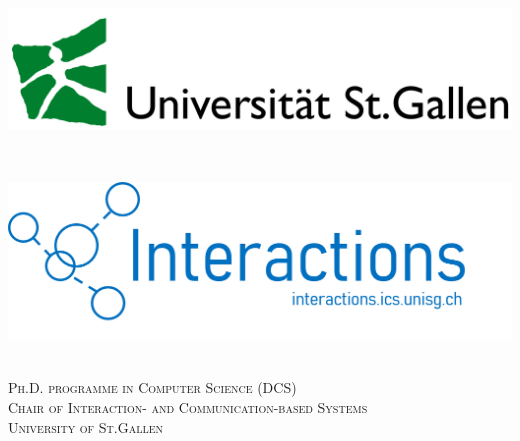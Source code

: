 \documentclass[a4paper,11pt]{article}
\begin{document}
\begin{titlepage}

\newcommand{\HRule}{\rule{\linewidth}{0.5mm}}
\setlength{\topmargin}{0in}
\center

\begin{minipage}{0.4\textwidth}
\begin{flushleft} \large
\hspace*{-0.5cm}
\includegraphics[scale=0.1]{logos/hsg.png}\\
\end{flushleft}
\end{minipage}
~
\begin{minipage}{0.5\textwidth}
\begin{flushright} \large
\hspace*{2cm}
\includegraphics[scale=0.3]{logos/interactions.png}\\
\end{flushright}
\end{minipage} \\[1cm]

\textsc{\Large Ph.D. programme in Computer Science (DCS)} \\[0.5cm]
\textsc{\Large Chair of Interaction- and Communication-based Systems} \\[0.5cm]
\textsc{\LARGE University of St.Gallen}\\[2.0cm]



\end{titlepage}
\end{document}
